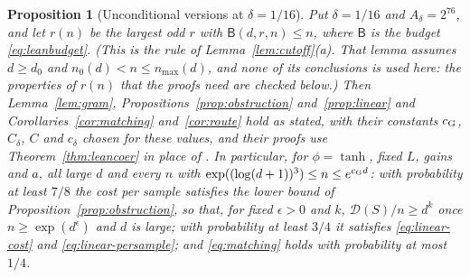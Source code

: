 \documentclass[11pt]{article}
\newtheorem{proposition}[theorem]{Proposition}
\theoremstyle{definition}\newtheorem{assumption}[theorem]{Assumption}
\theoremstyle{remark}\newtheorem{remark}[theorem]{Remark}
\begin{document}
\begin{proposition}[Unconditional versions at $\delta=1/16$]\label{prop:uncond}
Put $\delta=1/16$ and $A_\delta=2^{76}$, and let $r(n)$ be the largest odd
$r$ with $\mathsf B(d,r,n)\le n$, where $\mathsf B$ is the budget
\eqref{eq:leanbudget}. (This is the rule of Lemma~\ref{lem:cutoff}(a).
That lemma assumes $d\ge d_0$ and $n_0(d)<n\le n_{\max}(d)$, and none of
its conclusions is used here: the properties of $r(n)$ that the proofs
need are checked below.) Then
Lemma~\ref{lem:gram}, Propositions~\ref{prop:obstruction}
and~\ref{prop:linear} and Corollaries~\ref{cor:matching}
and~\ref{cor:route} hold as stated, with their constants $c_{\rm G}$,
$C_\delta$, $C$ and $c_\delta$ chosen for these values, and their proofs use
Theorem~\ref{thm:leancoer} in place of \cite[Lemma~4.4]{subcritical}. In
particular, for $\phi=\tanh$, fixed $L$, gains and $a$, all large $d$ and
every $n$ with $\exp((\log(d+1))^3)\le n\le e^{c_{\rm G}d}$: with
probability at least $7/8$ the cost per sample satisfies the lower bound
of Proposition~\ref{prop:obstruction}, so that, for fixed $\epsilon>0$ and
$k$, $\mathcal D(S)/n\ge d^k$ once $n\ge\exp(d^\epsilon)$ and $d$ is large;
with probability at least $3/4$ it satisfies \eqref{eq:linear-cost} and
\eqref{eq:linear-persample}; and \eqref{eq:matching} holds with
probability at most $1/4$.
\end{proposition}
\end{document}
